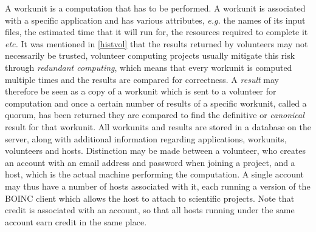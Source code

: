 A workunit is a computation that has to be performed. A workunit is associated with a specific application and has various attributes, \emph{e.g.} the names of its input files, the estimated time that it will run for, the resources required to complete it \emph{etc.} It was mentioned in \ref{histvol} that the results returned by volunteers may not necessarily be trusted, volunteer computing projects usually mitigate this risk through \emph{redundant computing}, which means that every workunit is computed multiple times and the results are compared for correctness. A \emph{result} may therefore be seen as a copy of a workunit which is sent to a volunteer for computation and once a certain number of results of a specific workunit, called a quorum, has been returned they are compared to find the definitive or \emph{ canonical} result for that workunit.
All workunits and results are stored in a database on the server, along with additional information regarding applications, workunits, volunteers and hosts. Distinction may be made between a volunteer, who creates an account with an email address and password when joining a project, and a host, which is the actual machine performing the computation. A single account may thus have a number of hosts associated with it, each running a version of the BOINC client which allows the host to attach to scientific projects. Note that credit is associated with an account, so that all hosts running under the same account earn credit in the same place.

